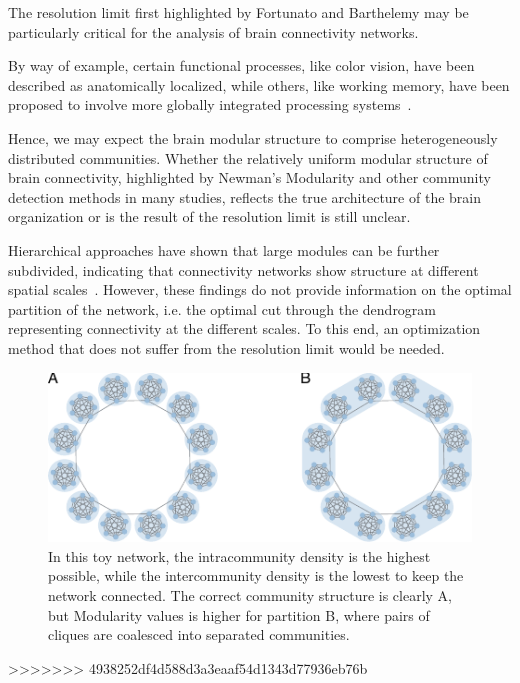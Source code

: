 The resolution limit  first highlighted by Fortunato and Barthelemy may be particularly critical for the analysis of brain connectivity networks.

By way of example, certain functional processes, like color vision, have been described as anatomically localized, while others, like working memory, have been proposed to involve more globally integrated processing systems~.

Hence, we may expect the brain modular structure to comprise heterogeneously distributed communities.
Whether the relatively uniform modular structure of brain connectivity, highlighted by Newman's Modularity and other community detection methods in many studies, reflects the true architecture of the brain organization or is the result of the resolution limit is still unclear.

Hierarchical approaches have shown that large modules can be further subdivided, indicating that connectivity networks show structure at different spatial scales~.
However, these findings do not provide information on the optimal partition of the network, i.e. the optimal cut through the dendrogram representing connectivity at the different scales.
To this end, an optimization method that does not suffer from the resolution limit would be needed.

\begin{figure}[htb!]
\centering
\includegraphics[width=1\textwidth]{images/traag_ring_of_cliques.pdf}
\caption{In this toy network, the intracommunity density is the highest possible, while the intercommunity density is the lowest to keep the network connected. The correct community structure is clearly A, but Modularity values is higher for partition B, where pairs of cliques are coalesced into separated communities.}
\label{fig:traag_ring_of_cliques}
\end{figure}

>>>>>>> 4938252df4d588d3a3eaaf54d1343d77936eb76b

